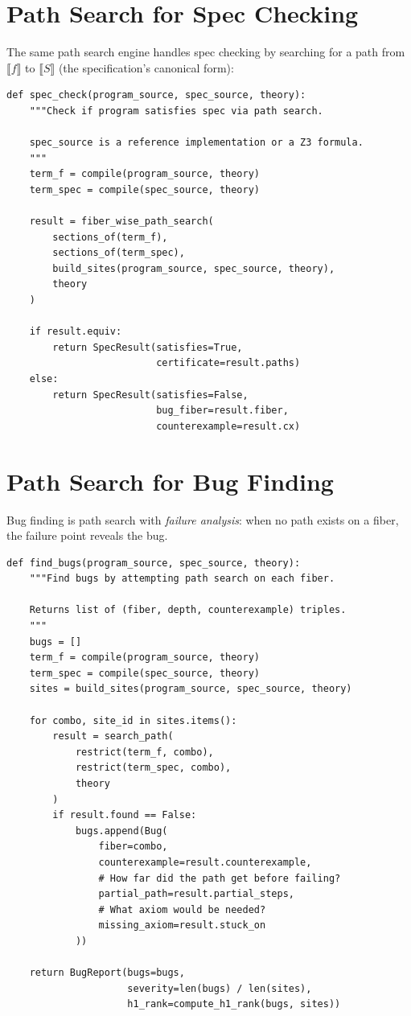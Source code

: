 \documentclass[11pt,a4paper]{report}
\theoremstyle{definition}
\theoremstyle{plain}
\newcommand{\den}[1]{\llbracket #1 \rrbracket}
\begin{document}
\section{Path Search for Spec Checking}

The same path search engine handles spec checking by searching for
a path from $\den{f}$ to $\den{S}$ (the specification's canonical
form):

\begin{lstlisting}[caption={Spec check via path search}]
def spec_check(program_source, spec_source, theory):
    """Check if program satisfies spec via path search.

    spec_source is a reference implementation or a Z3 formula.
    """
    term_f = compile(program_source, theory)
    term_spec = compile(spec_source, theory)

    result = fiber_wise_path_search(
        sections_of(term_f),
        sections_of(term_spec),
        build_sites(program_source, spec_source, theory),
        theory
    )

    if result.equiv:
        return SpecResult(satisfies=True,
                          certificate=result.paths)
    else:
        return SpecResult(satisfies=False,
                          bug_fiber=result.fiber,
                          counterexample=result.cx)
\end{lstlisting}

\section{Path Search for Bug Finding}

Bug finding is path search with \emph{failure analysis}: when no
path exists on a fiber, the failure point reveals the bug.

\begin{lstlisting}[caption={Bug finding via failed path search}]
def find_bugs(program_source, spec_source, theory):
    """Find bugs by attempting path search on each fiber.

    Returns list of (fiber, depth, counterexample) triples.
    """
    bugs = []
    term_f = compile(program_source, theory)
    term_spec = compile(spec_source, theory)
    sites = build_sites(program_source, spec_source, theory)

    for combo, site_id in sites.items():
        result = search_path(
            restrict(term_f, combo),
            restrict(term_spec, combo),
            theory
        )
        if result.found == False:
            bugs.append(Bug(
                fiber=combo,
                counterexample=result.counterexample,
                # How far did the path get before failing?
                partial_path=result.partial_steps,
                # What axiom would be needed?
                missing_axiom=result.stuck_on
            ))

    return BugReport(bugs=bugs,
                     severity=len(bugs) / len(sites),
                     h1_rank=compute_h1_rank(bugs, sites))
\end{lstlisting}
\end{document}
